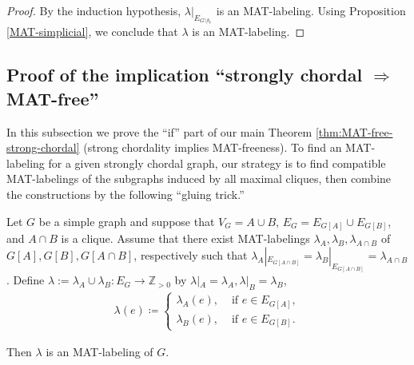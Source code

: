 \documentclass[ALCO, Unicode,published]{cedram}
\begin{document}
\begin{proof}
By the induction hypothesis, $ \lambda|_{E_{G\setminus b_{r}}} $ is an MAT-labeling. 
Using Proposition \ref{MAT-simplicial}, we conclude that $ \lambda $ is an MAT-labeling. 
\end{proof}

\subsection{Proof of the implication ``strongly chordal  \texorpdfstring{$\Rightarrow$}{implies} MAT-free''}
\label{sub:if-part}
 
In this subsection we prove the ``if'' part of our main Theorem \ref{thm:MAT-free-strong-chordal} (strong chordality implies MAT-freeness). 
To find an MAT-labeling for a given strongly chordal graph, our strategy is to find compatible MAT-labelings of the subgraphs induced by all maximal cliques, then combine the constructions by the following ``gluing trick.''
\begin{theorem}
\label{glue}
Let $ G $ be a simple graph and suppose that $ V_{G} = A \cup B$, $E_{G} = E_{G[A]} \cup E_{G[B]} $, and $ A \cap B $ is a clique. 
Assume that there exist MAT-labelings $ \lambda_{A}, \lambda_{B}, \lambda_{A \cap B} $ of $ G[A], G[B], G[A\cap B] $, respectively  such that $ \lambda_{A}|_{E_{G[A\cap B]}} = \lambda_{B}|_{E_{G[A\cap B]}} =\lambda_{A\cap B}$. 
Define $ \lambda :=\lambda_{A} \cup \lambda_{B} \colon E_{G} \to \mathbb{Z}_{>0} $ by $\lambda|_A = \lambda_{A}, \lambda|_B = \lambda_{B}$, \ie 
\begin{align*}
\lambda(e) \coloneqq \begin{cases}
\lambda_{A}(e), & \text{ if } e \in E_{G[A]}, \\
\lambda_{B}(e), & \text{ if } e \in E_{G[B]}. 
\end{cases}
\end{align*}
\end{theorem}
\noindent
Then $ \lambda $ is an MAT-labeling of $ G $.
 
\end{document}
